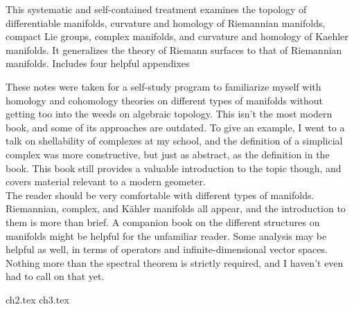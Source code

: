 \documentclass{../booknotes}
\begin{document}
\maketitle

\begin{pubdescrip}
	\indent \indent This systematic and self-contained treatment examines the topology of differentiable manifolds, curvature and homology of Riemannian manifolds, compact Lie groups, complex manifolds, and curvature and homology of Kaehler manifolds. It generalizes the theory of Riemann surfaces to that of Riemannian manifolds. Includes four helpful appendixes
\end{pubdescrip}

\begin{transcribernote}
	\indent These notes were taken for a self-study program to familiarize myself with homology and cohomology theories on different types of manifolds without getting too into the weeds on algebraic topology. This isn't the most modern book, and some of its approaches are outdated. To give an example, I went to a talk on shellability of complexes at my school, and the definition of a simplicial complex was more constructive, but just as abstract, as the definition in the book. This book still provides a valuable introduction to the topic though, and covers material relevant to a modern geometer. \\
	\indent The reader should be very comfortable with different types of manifolds. Riemannian, complex, and K\"ahler manifolds all appear, and the introduction to them is more than brief. A companion book on the different structures on manifolds might be helpful for the unfamiliar reader. Some analysis may be helpful as well, in terms of operators and infinite-dimensional vector spaces. Nothing more than the spectral theorem is strictly required, and I haven't even had to call on that yet.
\end{transcribernote}

\tableofcontents

{ch2.tex}
{ch3.tex}
\end{document}
